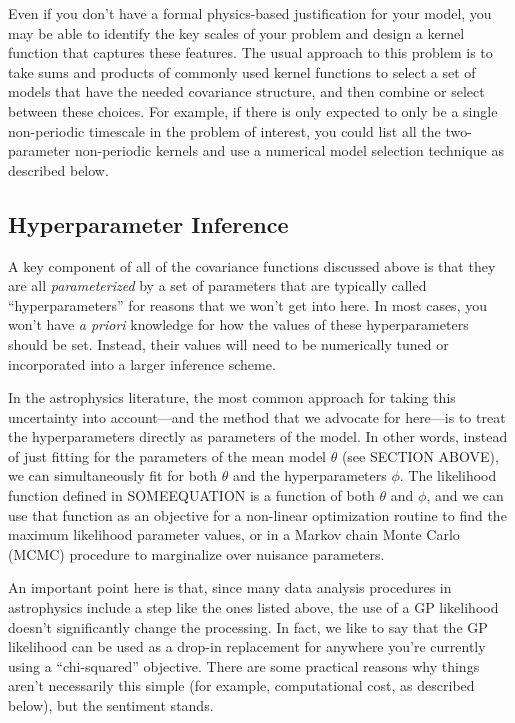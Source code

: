 \documentclass[letterpaper]{ar-1col}
\begin{document}
Even if you don't have a formal physics-based justification for your model, you may be able to identify the key scales of your problem and design a kernel function that captures these features.
The usual approach to this problem is to take sums and products of commonly used kernel functions to select a set of  models that have the needed covariance structure, and then combine or select between these choices.
For example, if there is only expected to only be a single non-periodic timescale in the problem of interest, you could list all the two-parameter non-periodic kernels and use a numerical model selection technique as described below.


\subsection{Hyperparameter Inference}

A key component of all of the covariance functions discussed above is that they are all \emph{parameterized} by a set of parameters that are typically called ``hyperparameters'' for reasons that we won't get into here.
In most cases, you won't have \emph{a priori} knowledge for how the values of these hyperparameters should be set.
Instead, their values will need to be numerically tuned or incorporated into a larger inference scheme.

In the astrophysics literature, the most common approach for taking this uncertainty into account---and the method that we advocate for here---is to treat the hyperparameters directly as parameters of the model.
In other words, instead of just fitting for the parameters of the mean model $\theta$ (see SECTION ABOVE), we can simultaneously fit for both $\theta$ and the hyperparameters $\phi$.
The likelihood function defined in SOMEEQUATION is a function of both $\theta$ and $\phi$, and we can use that function as an objective for a non-linear optimization routine to find the maximum likelihood parameter values, or in a Markov chain Monte Carlo (MCMC) procedure to marginalize over nuisance parameters.

An important point here is that, since many data analysis procedures in astrophysics include a step like the ones listed above, the use of a GP likelihood doesn't significantly change the processing.
In fact, we like to say that the GP likelihood can be used as a drop-in replacement for anywhere you're currently using a ``chi-squared'' objective.
There are some practical reasons why things aren't necessarily this simple (for example, computational cost, as described below), but the sentiment stands.
\end{document}

